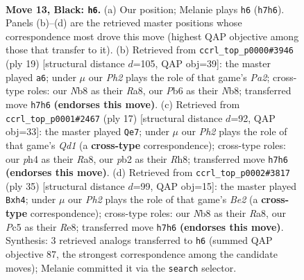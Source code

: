 \documentclass[11pt]{article}
\begin{document}
\clearpage

\begin{figure}[p]\centering
\begin{subfigure}{0.46\textwidth}\centering
\resizebox{\linewidth}{!}{%
\newchessgame
\chessboard[
  setfen={rn1qr1k1/p2n1pbp/1p1p2p1/2pP4/P3PPPP/2N5/1P2N3/R1BQK2R b KQ - 0 13},
  showmover=false,
  pgfstyle=straightmove, color=movearrow, markmove={h7-h6}
]}
\caption{}
\end{subfigure}\hfill
\begin{subfigure}{0.46\textwidth}\centering
\resizebox{\linewidth}{!}{%
\newchessgame
\chessboard[
  setfen={rnbqr1k1/pp3pbp/3p1np1/2pP4/8/2N2NP1/PP2PPBP/R1BQR1K1 b - - 7 10},
  showmover=false,
  pgfstyle=straightmove, color=movearrow, markmove={a7-a6}
]}
\caption{}
\end{subfigure}
\\[4pt]
\begin{subfigure}{0.46\textwidth}\centering
\resizebox{\linewidth}{!}{%
\newchessgame
\chessboard[
  setfen={rn1qk2r/pbp2ppp/1p1ppn2/8/2PPP3/5NP1/PPQN1PBP/R3K2R b KQkq - 1 9},
  showmover=false,
  pgfstyle=straightmove, color=movearrow, markmove={d8-e7}
]}
\caption{}
\end{subfigure}\hfill
\begin{subfigure}{0.46\textwidth}\centering
\resizebox{\linewidth}{!}{%
\newchessgame
\chessboard[
  setfen={r3rnk1/1p1qbppp/2p1p3/p2nP3/P2PN2P/2N5/1P2QPP1/R1BR2K1 b - - 0 18},
  showmover=false,
  pgfstyle=straightmove, color=movearrow, markmove={e7-h4}
]}
\caption{}
\end{subfigure}
\caption{\textbf{Move 13, Black: \texttt{h6}.} (a) Our position; Melanie plays \texttt{h6} (\texttt{h7h6}). Panels (b)--(d) are the retrieved master positions whose correspondence most drove this move (highest QAP objective among those that transfer to it). (b) Retrieved from \texttt{ccrl\_top\_p0000\#3946} (ply 19) [structural distance $d$=105, QAP obj=39]: the master played \texttt{a6}; under $\mu$ our \emph{Ph2} plays the role of that game's \emph{Pa2}; cross-type roles: our \emph{N}b8 as their \emph{R}a8, our \emph{P}b6 as their \emph{N}b8; transferred move \texttt{h7h6} \textbf{(endorses this move)}. (c) Retrieved from \texttt{ccrl\_top\_p0001\#2467} (ply 17) [structural distance $d$=92, QAP obj=33]: the master played \texttt{Qe7}; under $\mu$ our \emph{Ph2} plays the role of that game's \emph{Qd1} (a \textbf{cross-type} correspondence); cross-type roles: our \emph{p}h4 as their \emph{R}a8, our \emph{p}b2 as their \emph{R}h8; transferred move \texttt{h7h6} \textbf{(endorses this move)}. (d) Retrieved from \texttt{ccrl\_top\_p0002\#3817} (ply 35) [structural distance $d$=99, QAP obj=15]: the master played \texttt{Bxh4}; under $\mu$ our \emph{Ph2} plays the role of that game's \emph{Be2} (a \textbf{cross-type} correspondence); cross-type roles: our \emph{N}b8 as their \emph{R}a8, our \emph{P}c5 as their \emph{R}e8; transferred move \texttt{h7h6} \textbf{(endorses this move)}. Synthesis: 3 retrieved analogs transferred to \texttt{h6} (summed QAP objective 87, the strongest correspondence among the candidate moves); Melanie committed it via the \texttt{search} selector.}
\label{fig:thought-m25}
\end{figure}
\end{document}
